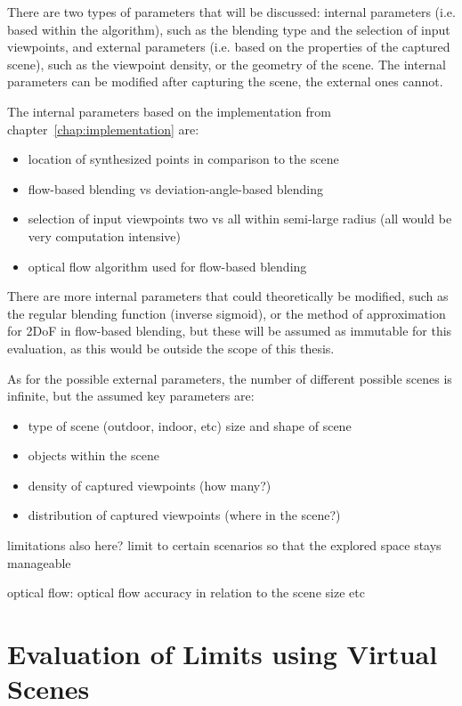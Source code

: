 There are two types of parameters that will be discussed: internal parameters (i.e. based within the algorithm), such as the blending type and the selection of input viewpoints, and external parameters (i.e. based on the properties of the captured scene), such as the viewpoint density, or the geometry of the scene. The internal parameters can be modified after capturing the scene, the external ones cannot. 

The internal parameters based on the implementation from chapter~\ref{chap:implementation} are:
\begin{itemize}
  \item location of synthesized points in comparison to the scene
  \item flow-based blending vs deviation-angle-based blending
  \item selection of input viewpoints \ar two vs all within semi-large radius (all would be very computation intensive)
  \item optical flow algorithm used for flow-based blending
\end{itemize}

There are more internal parameters that could theoretically be modified, such as the regular blending function (inverse sigmoid), or the method of approximation for 2DoF in flow-based blending, but these will be assumed as immutable for this evaluation, as this would be outside the scope of this thesis.

As for the possible external parameters, the number of different possible scenes is infinite, but the assumed key parameters are:
\begin{itemize}
  \item type of scene (outdoor, indoor, etc) \ar size and shape of scene
  \item objects within the scene
  \item density of captured viewpoints (how many?)
  \item distribution of captured viewpoints (where in the scene?)
\end{itemize}
limitations also here?
limit to certain scenarios so that the explored space stays manageable

optical flow:
optical flow accuracy in relation to the scene size etc

\section{Evaluation of Limits using Virtual Scenes}

